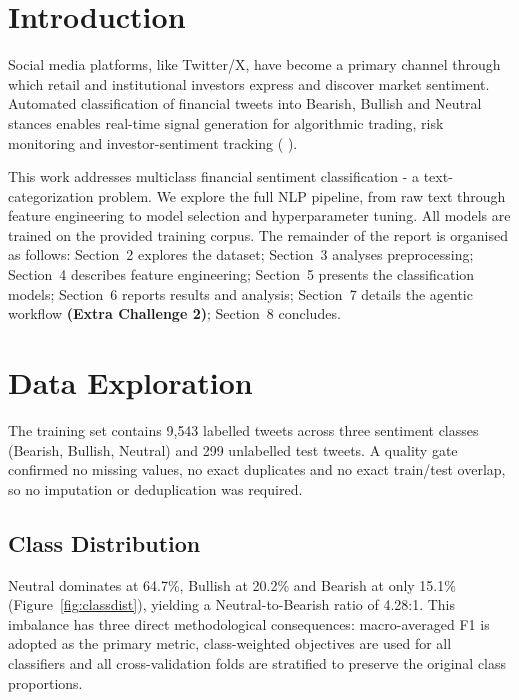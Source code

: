 \documentclass[11pt,a4paper]{article}
\begin{document}
\section{Introduction}
Social media platforms, like Twitter/X, have become a primary channel through which
retail and institutional investors express and discover market sentiment. Automated classification
of financial tweets into Bearish, Bullish and Neutral stances enables real-time signal generation
for algorithmic trading, risk monitoring and investor-sentiment tracking (\cite{antweiler2004talk} \cite{bollen2011twitter} ).

This work addresses multiclass financial sentiment classification - a text-categorization
problem. We explore the full NLP pipeline, from raw text through feature engineering to
model selection and hyperparameter tuning. All
models are trained on the provided training corpus. The remainder of the report is
organised as follows: Section~2 explores the dataset; Section~3 analyses preprocessing; Section~4
describes feature engineering; Section~5 presents the classification models; Section~6 reports results and analysis; Section~7
details the agentic workflow \textbf{(Extra Challenge 2)}; Section~8 concludes.


\section{Data Exploration}

The training set contains 9{,}543 labelled tweets across three sentiment classes (Bearish,
Bullish, Neutral) and 299 unlabelled test tweets. A quality gate confirmed no missing
values, no exact duplicates and no exact train/test overlap, so no imputation or
deduplication was required.

\subsection{Class Distribution}

Neutral dominates at 64.7\%, Bullish at 20.2\% and Bearish at only 15.1\%
(Figure~\ref{fig:classdist}), yielding a Neutral-to-Bearish ratio of 4.28:1. This
imbalance has three direct methodological consequences: macro-averaged F1 is adopted as
the primary metric, class-weighted objectives are used for all classifiers and all
cross-validation folds are stratified to preserve the original class proportions.
\end{document}
